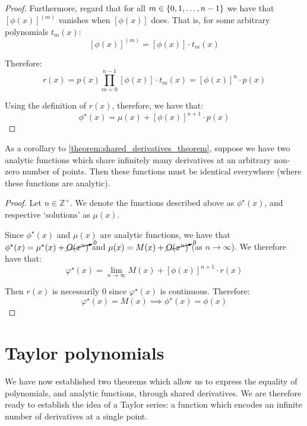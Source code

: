 \begin{theorem}
\begin{proof}
        Furthermore, regard that for all $m\in\{0,1,\dots,n-1\}$ we have that $[\phi(x)]^{(m)}$ vanishes when $[\phi(x)]$ does. That is, for some arbitrary polynomials $t_m(x)$:
        $$
            [\phi(x)]^{(m)}=[\phi(x)]\cdot t_m(x)
        $$

        Therefore:
        $$
            r(x) = p(x)\prod_{m=0}^{n-1}{[\phi(x)]\cdot t_{m}(x)} = [\phi(x)]^{n}\cdot p(x)
        $$

        Using the definition of $r(x)$, therefore, we have that:
        $$
            \phi^\star(x) = \mu(x) + [\phi(x)]^{n+1}\cdot p(x)
        $$
    \end{proof}
\end{theorem}

\begin{theorem}
    \label{theorem:analytic_function_equality}
    As a corollary to \autoref{theorem:shared_derivatives_theorem}, suppose we have two analytic functions which share infinitely many derivatives at an arbitrary non-zero number of points. Then these functions must be identical everywhere (where these functions are analytic).

    \begin{proof}
        Let $n\in\mathbb{Z}^+$. We denote the functions described above as $\phi^\star(x)$, and respective `solutions' as $\mu(x)$.

        Since $\phi^\star(x)$ and $\mu(x)$ are analytic functions, we have that $\phi^\star(x)=\mu^\star(x)+\cancelto{0}{O(x^n)}$ and $\mu(x)=M(x)+\cancelto{0}{O(x^n)}$ (as $n\to\infty$). We therefore have that:
        $$
            \varphi^\star(x) = \lim_{n\to\infty}{M(x) + [\phi(x)]^{n+1}\cdot r(x)}
        $$

        Then $r(x)$ is necessarily $0$ since $\varphi^\star(x)$ is continuous. Therefore:
        $$
            \varphi^\star(x) = M(x) \implies \phi^\star(x) = \phi(x)
        $$
    \end{proof}
\end{theorem}

\section{Taylor polynomials}
We have now established two theorems which allow us to express the equality of polynomials, and analytic functions, through shared derivatives. We are therefore ready to establish the idea of a Taylor series: a function which encodes an infinite number of derivatives at a single point.

